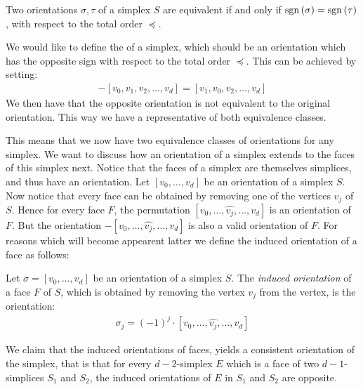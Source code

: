 \begin{lemma}
	Two orientations $\sigma, \tau$ of a simplex $S$ are equivalent if and only if $\operatorname{sgn}\left(\sigma\right) = \operatorname{sgn}\left(\tau\right)$, with respect to the total order $\preceq$.
\end{lemma}

We would like to define the  of a simplex, which should be an orientation which has the opposite sign with respect to the total order $\preceq$. This can be achieved by setting:
\begin{align*}
	- [v_0, v_1, v_2, \dots, v_d] = [v_1, v_0, v_2, \dots, v_d]
\end{align*}
We then have that the opposite orientation is not equivalent to the original orientation. This way we have a representative of both equivalence classes.

This means that we now have two equivalence classes of orientations for any simplex. We want to discuss how an orientation of a simplex extends to the faces of this simplex next. Notice that the faces of a simplex are themselves simplices, and thus have an orientation. Let $[v_0, \dots, v_{d}]$ be an orientation of a simplex $S$. Now notice that every face can be obtained by removing one of the vertices $v_j$ of $S$. Hence for every face $F$, the permutation $[v_0, \dots, \hat{v_j}, \dots, v_{d}]$ is an orientation of $F$. But the orientation $- [v_0, \dots, \hat{v_j}, \dots, v_{d}]$ is also a valid orientation of $F$. For reasons which will become appearent latter we define the induced orientation of a face as follows:

\begin{definition}
	Let $\sigma = [v_0, \dots, v_{d}]$ be an orientation of a simplex $S$. The \emph{induced orientation} of a face $F$ of $S$, which is obtained by removing the vertex $v_j$ from the vertex, is the orientation:
	\begin{align*}
		\sigma_j = (-1)^j \cdot [v_0, \dots, \hat{v_j}, \dots, v_{d}]
	\end{align*}
\end{definition}

We claim that the induced orientations of faces, yields a consistent orientation of the simplex, that is that for every $d-2$-simplex $E$ which is a face of two $d-1$-simplices $S_1$ and $S_2$, the induced orientations of $E$ in $S_1$ and $S_2$ are opposite.

